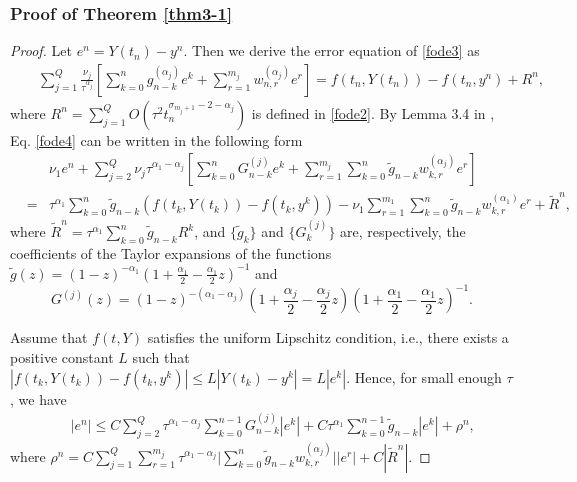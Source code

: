\documentclass[10pt]{siamltex}
\begin{document}
\subsubsection{Proof of Theorem \ref{thm3-1}}
\begin{proof}
Let $e^n=Y(t_n)-y^n$.
Then we derive the error equation of \eqref{fode3}  as
\begin{eqnarray}
&&\sum_{j=1}^Q\frac{\nu_j}{\tau^{\alpha_j}}\left[\sum_{k=0}^ng^{(\alpha_j)}_{n-k}e^k
+\sum_{r=1}^{m_j}w^{(\alpha_j)}_{n,r}e^r\right] = f(t_n,Y(t_n))-f(t_n,y^n)+R^n,\label{fode4}
\end{eqnarray}
where $R^n=\sum_{j=1}^QO(\tau^2t_{n}^{\sigma_{m_j+1}-2-\alpha_j})$ is defined in \eqref{fode2}.
By  Lemma 3.4 in \cite{ZengLLT13},
Eq. \eqref{fode4} can be written in the following form
\begin{eqnarray}
&&\nu_1e^n+\sum_{j=2}^Q{\nu_j}{\tau^{\alpha_1-\alpha_j}}\left[\sum_{k=0}^nG^{(j)}_{n-k}e^k +\sum_{r=1}^{m_j}\sum_{k=0}^n\tilde{g}_{n-k}w^{(\alpha_j)}_{k,r}e^r \right]\nonumber \\
&=& {\tau^{\alpha_1}}\sum_{k=0}^n\tilde{g}_{n-k}(f(t_k,Y(t_k))-f(t_k,y^k))
-\nu_1\sum_{r=1}^{m_1}\sum_{k=0}^n\tilde{g}_{n-k}w^{(\alpha_1)}_{k,r}e^r+\tilde{R}^n,\label{fode5}
\end{eqnarray}
where $\tilde{R}^n={\tau^{\alpha_1}}\sum_{k=0}^n\tilde{g}_{n-k}R^k$, and
$\{\tilde{g}_k\}$ and  $\{G^{(j)}_{k}\}$  are, respectively, the coefficients of the
Taylor expansions of the  functions
$\tilde{g}(z)=(1-z)^{-\alpha_1}
\left(1+\frac{\alpha_1}{2}-\frac{\alpha_1}{2}z\right)^{-1}$  and
$$G^{(j)}(z)=(1-z)^{-(\alpha_1-\alpha_j)}
\left(1+\frac{\alpha_j}{2}-\frac{\alpha_j}{2}z\right)
\left(1+\frac{\alpha_1}{2}-\frac{\alpha_1}{2}z\right)^{-1}.$$


Assume that $f(t,Y)$ satisfies the uniform  Lipschitz condition, i.e., there exists a positive
constant $L$ such that
$|f(t_k,Y(t_k))-f(t_k,y^k)|\leq L|Y(t_k)-y^k|=L|e^k|$. Hence, for small enough $\tau$,
we have
\begin{eqnarray}
&&|e^n|\leq C\sum_{j=2}^Q{\tau^{\alpha_1-\alpha_j}}\sum_{k=0}^{n-1}G^{(j)}_{n-k}|e^k|
+C{\tau^{\alpha_1}}\sum_{k=0}^{n-1}\tilde{g}_{n-k}|e^k| +\rho^n,\label{fode7}
\end{eqnarray}
where
$\rho^n=C\sum_{j=1}^Q\sum_{r=1}^{m_j}\tau^{\alpha_1-\alpha_j}
\Big|\sum_{k=0}^n\tilde{g}_{n-k}w^{(\alpha_j)}_{k,r}\Big||e^r|+C|\tilde{R}^n|.$



\end{proof}
\end{document}
